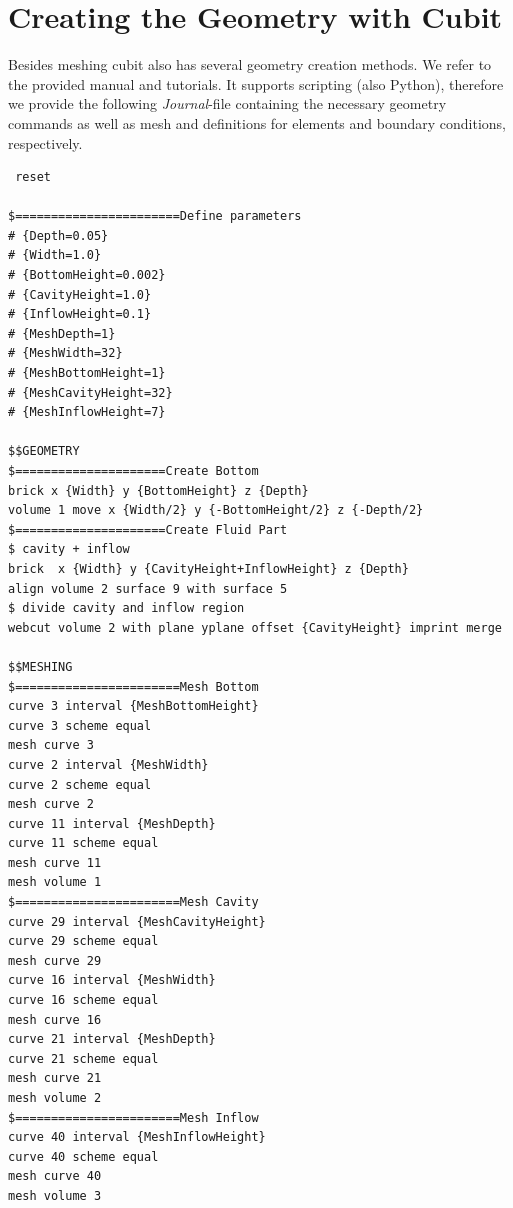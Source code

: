 \section{Creating the Geometry with Cubit}

Besides meshing cubit also has several geometry creation methods. We refer
to the provided manual and tutorials. It supports scripting (also Python),
therefore we provide the following \textit{Journal}-file containing the
necessary geometry commands as well as mesh and definitions for elements and
boundary conditions, respectively.

\begin{small} \begin{verbatim}
 reset

$=======================Define parameters
# {Depth=0.05}
# {Width=1.0}
# {BottomHeight=0.002}
# {CavityHeight=1.0}
# {InflowHeight=0.1}
# {MeshDepth=1}
# {MeshWidth=32}
# {MeshBottomHeight=1}
# {MeshCavityHeight=32}
# {MeshInflowHeight=7}

$$GEOMETRY
$=====================Create Bottom
brick x {Width} y {BottomHeight} z {Depth}
volume 1 move x {Width/2} y {-BottomHeight/2} z {-Depth/2}
$=====================Create Fluid Part
$ cavity + inflow
brick  x {Width} y {CavityHeight+InflowHeight} z {Depth}
align volume 2 surface 9 with surface 5
$ divide cavity and inflow region
webcut volume 2 with plane yplane offset {CavityHeight} imprint merge

$$MESHING
$=======================Mesh Bottom
curve 3 interval {MeshBottomHeight}
curve 3 scheme equal
mesh curve 3
curve 2 interval {MeshWidth}
curve 2 scheme equal
mesh curve 2
curve 11 interval {MeshDepth}
curve 11 scheme equal
mesh curve 11
mesh volume 1
$=======================Mesh Cavity
curve 29 interval {MeshCavityHeight}
curve 29 scheme equal
mesh curve 29
curve 16 interval {MeshWidth}
curve 16 scheme equal
mesh curve 16
curve 21 interval {MeshDepth}
curve 21 scheme equal
mesh curve 21
mesh volume 2
$=======================Mesh Inflow
curve 40 interval {MeshInflowHeight}
curve 40 scheme equal
mesh curve 40
mesh volume 3


\end{verbatim}
\end{small}
